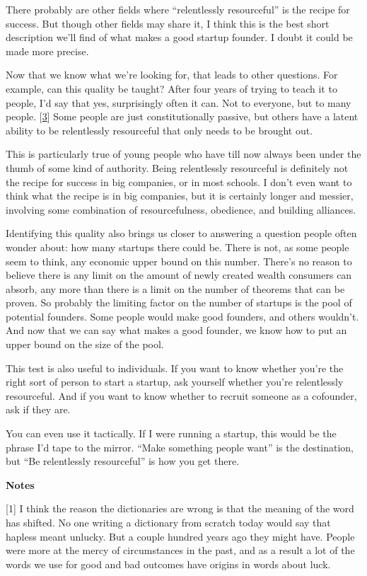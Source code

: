 There probably are other fields where ``relentlessly resourceful'' is
the recipe for success. But though other fields may share it, I think
this is the best short description we'll find of what makes a good
startup founder. I doubt it could be made more precise.

Now that we know what we're looking for, that leads to other questions.
For example, can this quality be taught? After four years of trying to
teach it to people, I'd say that yes, surprisingly often it can. Not to
everyone, but to many people. {[}\hyperref[f3n]{3}{]} Some people are
just constitutionally passive, but others have a latent ability to be
relentlessly resourceful that only needs to be brought out.

This is particularly true of young people who have till now always been
under the thumb of some kind of authority. Being relentlessly
resourceful is definitely not the recipe for success in big companies,
or in most schools. I don't even want to think what the recipe is in big
companies, but it is certainly longer and messier, involving some
combination of resourcefulness, obedience, and building alliances.

Identifying this quality also brings us closer to answering a question
people often wonder about: how many startups there could be. There is
not, as some people seem to think, any economic upper bound on this
number. There's no reason to believe there is any limit on the amount of
newly created wealth consumers can absorb, any more than there is a
limit on the number of theorems that can be proven. So probably the
limiting factor on the number of startups is the pool of potential
founders. Some people would make good founders, and others wouldn't. And
now that we can say what makes a good founder, we know how to put an
upper bound on the size of the pool.

This test is also useful to individuals. If you want to know whether
you're the right sort of person to start a startup, ask yourself whether
you're relentlessly resourceful. And if you want to know whether to
recruit someone as a cofounder, ask if they are.

You can even use it tactically. If I were running a startup, this would
be the phrase I'd tape to the mirror. ``Make something people want'' is
the destination, but ``Be relentlessly resourceful'' is how you get
there.

\textbf{Notes}

{[}1{]} I think the reason the dictionaries are wrong is that the
meaning of the word has shifted. No one writing a dictionary from
scratch today would say that hapless meant unlucky. But a couple hundred
years ago they might have. People were more at the mercy of
circumstances in the past, and as a result a lot of the words we use for
good and bad outcomes have origins in words about luck.

